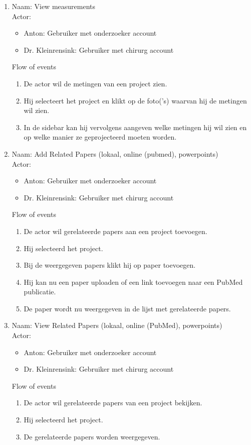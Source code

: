 \begin{enumerate}
\item   Naam: View measurements \\
	Actor:
	\begin{itemize}
		\item Anton: Gebruiker met onderzoeker account
		\item Dr. Kleinrensink: Gebruiker met chirurg account
	\end{itemize}
	Flow of events
	\begin{enumerate}
		\item De actor wil de metingen van een project zien.
		\item Hij selecteert het project en klikt op de foto('s) waarvan hij de metingen wil zien.
		\item In de sidebar kan hij vervolgens aangeven welke metingen hij wil zien en op welke manier ze geprojecteerd moeten worden.
	\end{enumerate}


\item   Naam: Add Related Papers (lokaal, online (pubmed), powerpoints) \\
	Actor:
	\begin{itemize}
		\item Anton: Gebruiker met onderzoeker account
		\item Dr. Kleinrensink: Gebruiker met chirurg account
	\end{itemize}
	Flow of events
	\begin{enumerate}
		\item De actor wil gerelateerde papers aan een project toevoegen.
		\item Hij selecteerd het project.
		\item Bij de weergegeven papers klikt hij op paper toevoegen.
		\item Hij kan nu een paper uploaden of een link toevoegen naar een PubMed publicatie.
		\item De paper wordt nu weergegeven in de lijst met gerelateerde papers.
	\end{enumerate}


\item   Naam: View Related Papers (lokaal, online (PubMed), powerpoints)  \\
	Actor:
	\begin{itemize}
		\item Anton: Gebruiker met onderzoeker account
		\item Dr. Kleinrensink: Gebruiker met chirurg account
	\end{itemize}
	Flow of events
	\begin{enumerate}
		\item De actor wil gerelateerde papers van een project bekijken.
		\item Hij selecteerd het project.
		\item De gerelateerde papers worden weergegeven. 
	\end{enumerate}



\end{enumerate}
